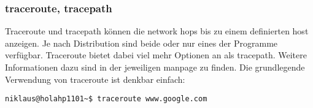 \subsubsection{traceroute, tracepath}
Traceroute und tracepath k\"onnen die network hops bis zu einem definierten host anzeigen. Je nach Distribution sind beide oder nur eines der Programme verf\"ugbar. Traceroute bietet dabei viel mehr Optionen an als tracepath. Weitere Informationen dazu sind in der jeweiligen manpage zu finden. Die grundlegende Verwendung von traceroute ist denkbar einfach:
\begin{lstlisting}[frame=single]
niklaus@holahp1101~$ traceroute www.google.com
\end{lstlisting}
